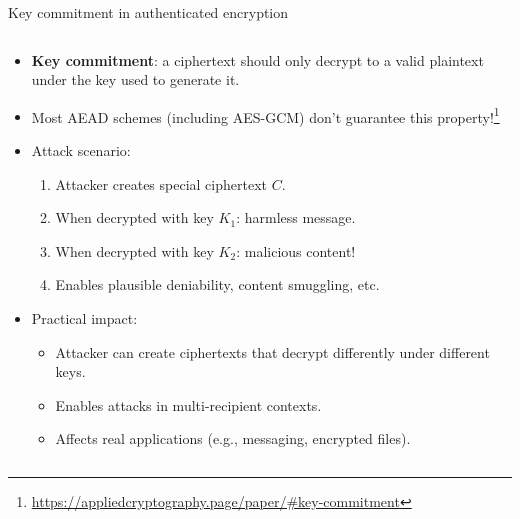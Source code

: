\documentclass[aspectratio=169, lualatex, handout]{beamer}
\begin{document}
\begin{frame}{Key commitment in authenticated encryption}
	\begin{columns}[c]
		\begin{column}{1\textwidth}
			\begin{itemize}
				\item \textbf{Key commitment}: a ciphertext should only decrypt to a valid plaintext under the key used to generate it.
				\item Most AEAD schemes (including AES-GCM) don't guarantee this property!\footnote{\url{https://appliedcryptography.page/paper/\#key-commitment}}
				\item Attack scenario:
				      \begin{enumerate}
					      \item Attacker creates special ciphertext $C$.
					      \item When decrypted with key $K_1$: harmless message.
					      \item When decrypted with key $K_2$: malicious content!
					      \item Enables plausible deniability, content smuggling, etc.
				      \end{enumerate}
				\item Practical impact:
				      \begin{itemize}
					      \item Attacker can create ciphertexts that decrypt differently under different keys.
					      \item Enables attacks in multi-recipient contexts.
					      \item Affects real applications (e.g., messaging, encrypted files).
				      \end{itemize}
			\end{itemize}
		\end{column}
	\end{columns}
\end{frame}
\end{document}
